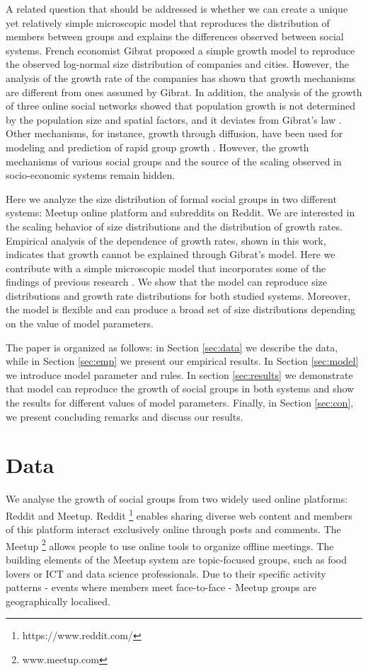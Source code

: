 A related question that should be addressed is whether we can create a unique yet relatively simple microscopic model that reproduces the distribution of members between groups and explains the differences observed between social systems. French economist Gibrat proposed a simple growth model to reproduce the observed log-normal size distribution of companies and cities. However, the analysis of the growth rate of the companies \cite{amaral1997scaling} has shown that growth mechanisms are different from ones assumed by Gibrat. In addition, the analysis of the growth of three online social networks showed that population growth is not determined by the population size and spatial factors, and it deviates from Gibrat's law \cite{zhu2014online}. Other mechanisms, for instance, growth through diffusion, have been used for modeling and prediction of rapid group growth \cite{kairam2012life}. However, the growth mechanisms of various social groups and the source of the scaling observed in socio-economic systems remain hidden.

Here we analyze the size distribution of formal social groups in two different systems: Meetup online platform and subreddits on Reddit. We are interested in the scaling behavior of size distributions and the distribution of growth rates. Empirical analysis of the dependence of growth rates, shown in this work, indicates that growth cannot be explained through Gibrat's model. Here we contribute with a simple microscopic model that incorporates some of the findings of previous research \cite{backstrom2006group, zheleva2009co}. We show that the model can reproduce size distributions and growth rate distributions for both studied systems. Moreover, the model is flexible and can produce a broad set of size distributions depending on the value of model parameters.

The paper is organized as follows: in Section \ref{sec:data} we describe the data, while in Section \ref{sec:emp} we present our empirical results. In Section \ref{sec:model} we introduce model parameter and rules. In section \ref{sec:results} we demonstrate that model can reproduce the growth of social groups in both systems and show the results for different values of model parameters. Finally, in Section \ref{sec:con}, we present concluding remarks and discuss our results. 

\section{Data \label{sec:data}}
We analyse the growth of social groups from two widely used online platforms: Reddit and Meetup. Reddit \footnote{https://www.reddit.com/} enables sharing diverse web content and members of this platform interact exclusively online through posts and comments. The Meetup \footnote{www.meetup.com} allows people to use online tools to organize offline meetings. The building elements of the Meetup system are topic-focused groups, such as food lovers or ICT and data science professionals. Due to their specific activity patterns - events where members meet face-to-face - Meetup groups are geographically localised. 


